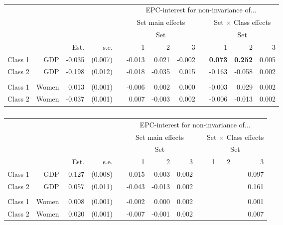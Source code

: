 \documentclass[letterpaper,12pt]{article}
\begin{document}
\begin{table}
	\begin{tabular}{lrrrrrrrrrrr}
	\hline
		&&&&&\multicolumn{7}{c}{EPC-interest for non-invariance of...}\\
	&&&&&\multicolumn{3}{c}{Set main effects} && \multicolumn{3}{c}{Set $\times$ Class effects}\\
			\hline
		&&&&&\multicolumn{3}{c}{Set} && \multicolumn{3}{c}{Set}\\
\cline{6-8}\cline{10-12}
			&	&	Est.&	s.e.&	&	1  &	2  &	3  &&	  1&	2 &	3\\
				\hline
Class	1&	GDP&	-0.035&	(0.007)&	&	-0.013&	0.021&	-0.002&&	\textbf{0.073}&	\textbf{0.252}&	0.005\\
Class	2&	GDP&	-0.198&	(0.012)&	&	-0.018&	-0.035&	0.015&&	-0.163&	-0.058&	0.002\\
\\
Class	1&	Women&	0.013&	(0.001)&	&	-0.006&	0.002&	0.000&&	-0.003&	0.029&	0.002\\
Class	2&	Women&	-0.037&	(0.001)&	&	0.007&	-0.003&	0.002&&	-0.006&	-0.013&	0.002\\
	\hline
\end{tabular}
	\caption{\label{tab:epc-interest-model1}}
\end{table}

\begin{table}
	\begin{tabular}{lrrrrrrrrrrr}
	\hline
		&&&&&\multicolumn{7}{c}{EPC-interest for non-invariance of...}\\
	&&&&&\multicolumn{3}{c}{Set main effects} && \multicolumn{3}{c}{Set $\times$ Class effects}\\
			\hline
		&&&&&\multicolumn{3}{c}{Set} && \multicolumn{3}{c}{Set}\\
\cline{6-8}\cline{10-12}
			&	&	Est.&	s.e.&	&	1  &	2  &	3  &&	  1&	2 &	3\\
				\hline
Class 1&	GDP&	-0.127&	(0.008)&	&	-0.015&	-0.003&	0.002&&	&	&	0.097\\
Class 2&	GDP&	0.057&	(0.011)&	&	-0.043&	-0.013&	0.002&&	&	&	0.161\\
\\
Class 	1&	Women&	0.008&	(0.001)&	&	-0.002&	0.000&	0.002&	&&	&	0.001\\
Class 	2&	Women&	0.020&	(0.001)&	&	-0.007&	-0.001&	0.002&	&&	&	0.007\\
\hline
	\end{tabular}
	\caption{\label{tab:epc-interest-model2}}

\end{table}
\end{document}
